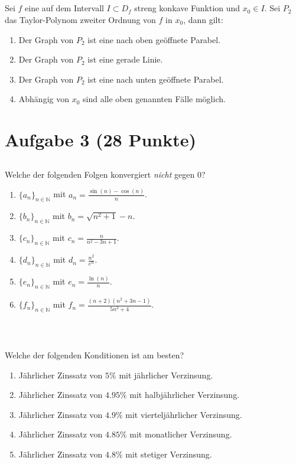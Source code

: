 \subsection*{}
Sei $f$ eine auf dem Intervall $I \subset D_f$ streng konkave Funktion und $x_0 \in I$. Sei $P_2 $ das Taylor-Polynom zweiter Ordnung von $f$ in $x_0$, dann gilt:
\renewcommand{\labelenumi}{(\alph{enumi})}
\begin{enumerate}
	\item 
	Der Graph von $P_2$ ist eine nach oben geöffnete Parabel.
	\item
	Der Graph von $P_2$ ist eine gerade Linie.
	\item
	Der Graph von $P_2$ ist eine nach unten geöffnete Parabel.
	\item
	Abhängig von $x_0$ sind alle oben genannten Fälle möglich.
\end{enumerate}


\newpage
\section*{Aufgabe 3 (28 Punkte)}
\vspace{0.4cm}

\subsection*{}
Welche der folgenden Folgen konvergiert \textit{nicht} gegen $0$?
\renewcommand{\labelenumi}{(\alph{enumi})}
\begin{enumerate}
	\item 
	$ \{a_n\}_{n \in \mathbb{N}} $ mit $a_n = \frac{\sin(n) - \cos(n)}{n}$.
	\item
	$ \{b_n\}_{n \in \mathbb{N}} $ mit $b_n = \sqrt{n^2 + 1 }  - n$.
	\item
	$ \{c_n\}_{n \in \mathbb{N}} $ mit $c_n = \frac{n}{n^2 - 3n +1 }$.
	\item
	$ \{d_n\}_{n \in \mathbb{N}} $ mit $d_n = \frac{n^2}{e^n}$.
	\item
	$ \{e_n\}_{n \in \mathbb{N}} $ mit $e_n = \frac{\ln(n)}{n}$.
	\item
	$ \{f_n\}_{n \in \mathbb{N}} $ mit $f_n = \frac{(n+2) (n^2 + 3n -1 )}{5n^3 + 4}$.
\end{enumerate}
\ \\
\subsection*{}
Welche der folgenden Konditionen ist am besten?
\renewcommand{\labelenumi}{(\alph{enumi})}
\begin{enumerate}
	\item 
	Jährlicher Zinssatz von $5 \%$ mit jährlicher Verzinsung.
	\item
	Jährlicher Zinssatz von $4.95 \%$ mit halbjährlicher Verzinsung.
	\item
	Jährlicher Zinssatz von $4.9 \%$ mit vierteljährlicher Verzinsung.
	\item
	Jährlicher Zinssatz von $4.85 \%$ mit monatlicher Verzinsung.
	\item
	Jährlicher Zinssatz von $4.8 \%$ mit stetiger Verzinsung.	
\end{enumerate}
\ \\
